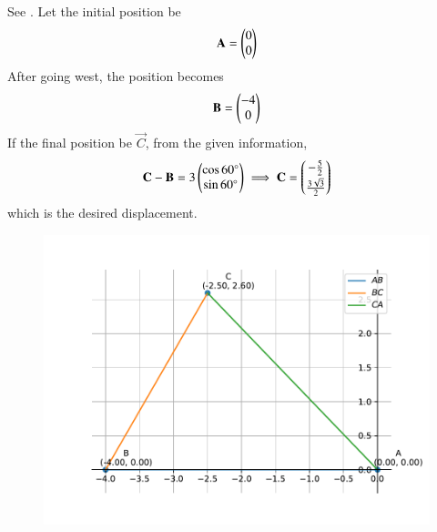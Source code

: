 See  
.
Let the initial position
be
\begin{align}
	\mathbf{A}=\begin{pmatrix}0\\0\end{pmatrix}
\end{align}
After going west, the position becomes
\begin{align}
			\mathbf{B}=\begin{pmatrix}-4\\0\end{pmatrix}
\end{align}
If the final position be $\vec{C}$, from the given information,
\begin{align}
	 \mathbf{C}-\mathbf{B}=3\begin{pmatrix}\cos{60\degree}\\\sin{60\degree}\end{pmatrix}
	 \implies 
	\mathbf{C}  
=\begin{pmatrix}-\frac{5}{2}\\[2pt] \frac{3\sqrt{3}}{2}\end{pmatrix}
\end{align}
which is the desired displacement. 
\begin{figure}[H] 
 \begin{center} 
 \includegraphics[width=0.75\columnwidth]{chapters/12/10/5/3/figs/fig.pdf} 
 \end{center} 
\caption{} 
\label{fig:chapters/12/10/5/3Fig1} 
\end{figure}

